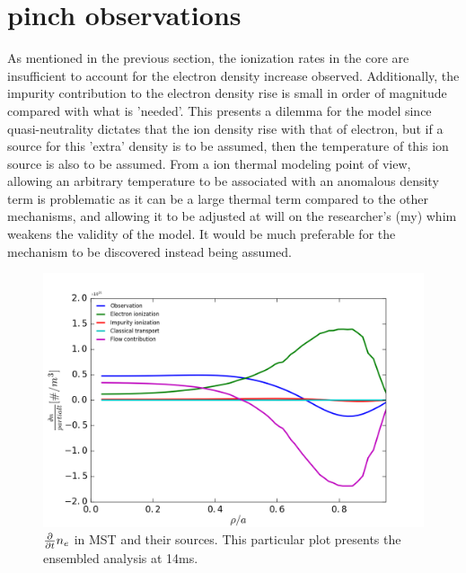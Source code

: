 \section{\ecb pinch observations}\label{sec:eb_pinch}

As mentioned in the previous section, the ionization rates in the core are insufficient to account for the electron density increase observed. Additionally, the impurity contribution to the electron density rise is small in order of magnitude compared with what is 'needed'. This presents a dilemma for the model since quasi-neutrality dictates that the ion density rise with that of electron, but if a source for this 'extra' density is to be assumed, then the temperature of this ion source is also to be assumed. From a ion thermal modeling point of view, allowing an arbitrary temperature to be associated with an anomalous density term is problematic as it can be a large thermal term compared to the other mechanisms, and allowing it to be adjusted at will on the researcher's (my) whim weakens the validity of the model. It would be much preferable for the mechanism to be discovered instead being assumed. 

\begin{figure}
    \centering
    \includegraphics{ion_transport_results/density_balance.png}
    \caption[$\partialt n_e$ in MST and their sources]{$\partialt n_e$ in MST and their sources. This particular plot presents the ensembled analysis at 14ms.}
    \label{fig:density_balance}
\end{figure}

